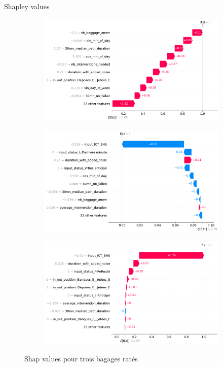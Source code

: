 \documentclass{beamer}
\begin{document}
\begin{frame}{Shapley values}
\begin{figure}[h!]
    \centering
    \begin{subfigure}[b]{0.45\textwidth}
        \centering
        \includegraphics[width=\textwidth]{shap values 1.png}
    \end{subfigure}
    \hfill
    \begin{subfigure}[b]{0.45\textwidth}
        \centering
        \includegraphics[width=\textwidth]{shap values 2.png}
    \end{subfigure}
    \break
    \begin{subfigure}[b]{0.45\textwidth}
        \centering
        \includegraphics[width=\textwidth]{shap values 3.png}
    \end{subfigure}
    \caption{Shap values pour trois bagages ratés}
\end{figure}
    
\end{frame}
\end{document}
